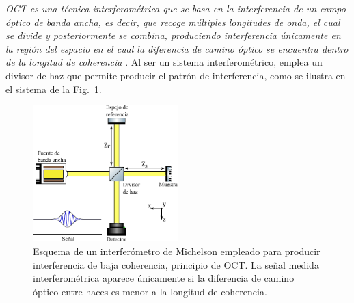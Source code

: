 \emph{ OCT es una técnica interferométrica que se basa en la interferencia de un campo óptico de banda ancha, es decir, que recoge múltiples longitudes de onda, el cual se divide y posteriormente se combina, produciendo interferencia únicamente en la región del espacio en el cual la diferencia de camino óptico se encuentra dentro de la longitud de coherencia} \cite{Fercher}. Al ser un sistema interferométrico, emplea un  divisor de haz que permite producir el patrón de interferencia, como se ilustra en el sistema de la Fig.~\ref{fig:OCT_Scheme}. 

\begin{figure}[ht!]
	\centering
	\includegraphics[width = 0.5\textwidth, keepaspectratio]{img/chap2/Carlos_oct_Scheme}
	\caption[Esquema básico de interferómetro para OCT]{Esquema de un interferómetro de Michelson empleado para producir interferencia de baja coherencia, principio de OCT. La señal medida interferométrica aparece únicamente si la diferencia de camino óptico entre haces es menor a la longitud de coherencia.}
	\label{fig:OCT_Scheme}
\end{figure}


